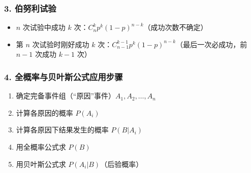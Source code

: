 \documentclass[12pt,a4paper]{ctexart}
\begin{document}
\subsubsection{3. 伯努利试验}
\begin{itemize}[noitemsep]
    \item $n$ 次试验中成功 $k$ 次：$C_n^k p^k (1-p)^{n-k}$（成功次数不确定）
    \item 第 $n$ 次试验时刚好成功 $k$ 次：$C_{n-1}^{k-1} p^k (1-p)^{n-k}$（最后一次必成功，前 $n-1$ 次成功 $k-1$ 次）
\end{itemize}

\subsubsection{4. 全概率与贝叶斯公式应用步骤}
\begin{enumerate}[noitemsep]
    \item 确定完备事件组（“原因”事件）$A_1, A_2, \dots, A_n$
    \item 计算各原因的概率 $P(A_i)$
    \item 计算各原因下结果发生的概率 $P(B|A_i)$
    \item 用全概率公式求 $P(B)$
    \item 用贝叶斯公式求 $P(A_i|B)$（后验概率）
\end{enumerate}
\end{document}
